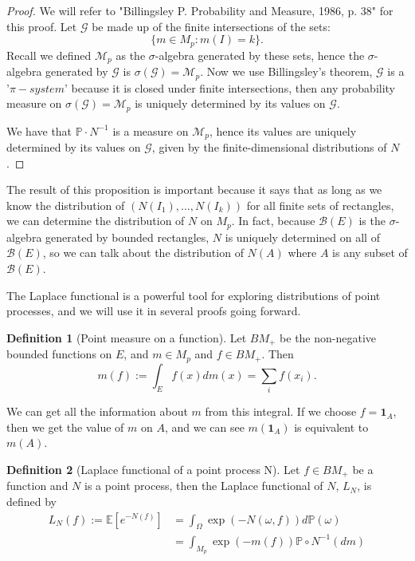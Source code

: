 \documentclass[11pt, oneside]{article}   	%
\theoremstyle{definition}
\newtheorem{definition}{Definition}[section]
\theoremstyle{remark}
\begin{document}
\begin{proof}
  We will refer to "Billingsley P. Probability and Measure, 1986, p. 38" \cite{billingsly1986} for this proof. Let $\mathcal{G}$ be made up of the finite intersections of the sets: 
$$\{m \in M_p : m(I) = k\}.$$ 
Recall we defined $\mathcal{M}_p$ as the $\sigma$-algebra generated by these sets, hence the $\sigma$-algebra generated by $\mathcal{G}$ is $\sigma(\mathcal{G})=\mathcal{M}_p$. Now we use Billingsley's theorem, $\mathcal{G}$ is a '$\pi-system$' because it is closed under finite intersections, then any probability measure on $\sigma(\mathcal{G})=\mathcal{M}_p$ is uniquely determined by its values on $\mathcal{G}$. 

We have that $\mathbb{P} \cdot N^{-1}$ is a measure on $\mathcal{M}_p$, hence its values are uniquely determined by its values on $\mathcal{G}$, given by the finite-dimensional distributions of $N$.
\end{proof}

The result of this proposition is important because it says that as long as we know the distribution of $(N(I_1),...,N(I_k))$ for all finite sets of rectangles, we can determine the distribution of $N$ on $M_p$. In fact, because $\mathcal{B}(E)$ is the $\sigma$-algebra generated by bounded rectangles, $N$ is uniquely determined on all of $\mathcal{B}(E)$, so we can talk about the distribution of $N(A)$ where $A$ is any subset of $\mathcal{B}(E)$.

The Laplace functional is a powerful tool for exploring distributions of point processes, and we will use it in several proofs going forward. 
\begin{definition}[Point measure on a function]
Let $BM_+$ be the non-negative bounded functions on $E$, and $m \in M_p$ and $f \in BM_+$. Then
$$m(f) :=\int_{E} f(x)dm(x) = \sum_{i}f(x_i).$$
\end{definition}

We can get all the information about $m$ from this integral. If we choose $f= \mathbf{1}_A$, then we get the value of $m$ on $A$, and we can see $m(\mathbf{1}_A)$ is equivalent to $m(A)$.

\begin{definition}[Laplace functional of a point process N]
  Let $f \in BM_+$ be a function and $N$ is a point process, then the Laplace functional of $N$, $L_N$, is defined by
  \begin{align*}L_N(f) := \mathbb{E}\left[e^{-N(f)}\right]&= \int_\Omega \exp \left( -N(\omega, f) \right)d \mathbb{P}(\omega) \\
    &=\int_{M_p} \exp \left( -m(f) \right) \mathbb{P} \circ N^{-1}(dm)
\end{align*}
\end{definition}
\end{document}
